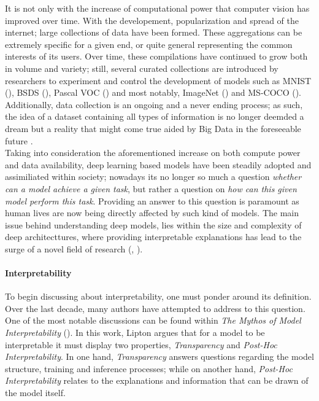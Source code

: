 \noindent It is not only with the increase of computational power that computer vision has improved over time. 
With the developement, popularization and spread of the internet; large collections of data have been 
formed. These aggregations can be extremely specific for a given end, or 
quite general representing the common interests of its users. Over time, these compilations have 
continued to grow both in volume and variety; still, several curated collections are introduced by 
researchers to experiment and control the development of models such as MNIST (\cite{lecun1998gradient}),
BSDS (\cite{MartinFTM01}), Pascal VOC (\cite{pascal-voc-2012}) and most notably, 
ImageNet (\cite{ILSVRC15}) and MS-COCO (\cite{lin2014microsoft}). Additionally, data collection is
an ongoing and a never ending process; as such, the idea of a dataset containing all types of 
information is no longer deemded a dream but a reality that might come true aided by Big Data in 
the foreseeable future \autocite{chen2014big}.\\

\noindent Taking into consideration the aforementioned  increase on  both compute power and data 
availability, deep learning based models have been steadily adopted and assimiliated within society; 
nowadays its no longer so much a question \textit{whether can a model achieve a given task}, but 
rather a question on \textit{how can this given model perform this task}. Providing an answer to 
this question is paramount as human lives are now being directly affected by such kind of models. 
The main issue behind understanding deep models, lies within the size and complexity of deep 
architecttures, where providing interpretable explanations has lead to the surge of a novel field 
of research (\cite{guidotti2018survey}, \cite{bodria2021benchmarking}).

\paragraph{Interpretability}
To begin discussing about interpretability, one must ponder around its definition. 
Over the last decade, many authors have attempted to address to this question. One 
of the most notable discussions can be found within \emph{The Mythos of Model Interpretability} 
(\cite{mythos_interp}). In this work, Lipton argues that for a model to be interpretable it must 
display two properties, \emph{Transparency} and \emph{Post-Hoc Interpretability}. In one hand, 
\textit{Transparency} answers questions regarding the model structure, training and inference 
processes; while on another hand, \textit{Post-Hoc Interpretability} relates to the explanations 
and information that can be drawn of the model itself.

